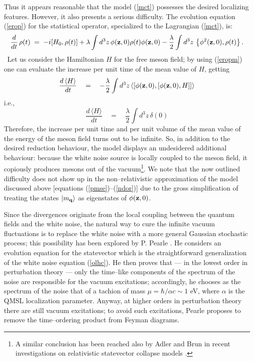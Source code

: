 \documentclass[10pt,a4paper]{article}
\begin{document}
Thus it appears reasonable that the model (\ref{mct}) possesses
the desired localizing features. However, it also presents a
serious difficulty. The evolution equation (\ref{erop}) for the
statistical operator, specialized to the Lagrangian (\ref{mct}),
is:
\begin{equation} \label{eropm}
\frac{d}{dt}\,\rho(t) \; = \; -i [H_{0}, \rho(t)] + \lambda \int
d^{3}z\, \phi({\bf z}, 0) \rho(t) \phi({\bf z}, 0) -
\frac{\lambda}{2} \int d^{3}z\, \left\{ \phi^{2}({\bf z}, 0),
\rho(t) \right\}.
\end{equation}\
Let us consider the Hamiltonian $H$ for the free meson field; by
using (\ref{eropm}) one can evaluate the increase per unit time of
the mean value of $H$, getting
\begin{equation}
\frac{d\, \langle H \rangle}{dt} \quad = \quad - \frac{\lambda}{2}
\int d^{3}z\, \langle [ \phi({\bf z}, 0), [\phi({\bf z}, 0), H]]
\rangle
\end{equation}
i.e.,
\begin{equation}
\frac{d\, \langle H \rangle}{dt} \quad = \quad \frac{\lambda}{2}
\int d^{3}z\, \delta(0)
\end{equation}
Therefore, the increase per unit time and per unit volume of the
mean value of the energy of the meson field turns out to be
infinite. So, in addition to the desired reduction behaviour, the
model displays an undesidered additional behaviour: because the
white noise source is locally coupled to the meson field, it
copiously produces mesons out of the vacuum\footnote{A similar
conclusion has been reached also by Adler and Brun in recent
investigations on relativistic statevector collapse models
\cite{ad3}.}. We note that the now outlined difficulty does not
show up in the non--relativistic approximation of the model
discussed above [equations (\ref{pmse})--(\ref{ndor})] due to the
gross simplification of treating the states $|m_{\bf q}\rangle$ as
eigenstates of $\phi({\bf z}, 0)$.

Since the divergences originate from the local coupling between the
quantum fields and the white noise, the natural way to cure the
infinite vacuum fluctuations is to replace the white noise with a
more general Gaussian stochastic process; this possibility has
been explored by P. Pearle \cite{ppo1, ppo2}. He considers an
evolution equation for the statevector which is the
straightforward generalization of the white noise equation
(\ref{olhc}). He then proves that --- in the lowest order in
perturbation theory --- only the time--like components of the
spectrum of the noise are responsible for the vacuum excitations;
accordingly, he chooses as the spectrum of the noise that of a
tachion  of mass $\mu = \hbar/\alpha c \sim 1$ eV, where $\alpha$
is the QMSL localization parameter. Anyway, at higher orders in
perturbation theory there are still vacuum excitations; to avoid
such excitations, Pearle proposes to remove the time--ordering
product from Feyman diagrams.
\end{document}
